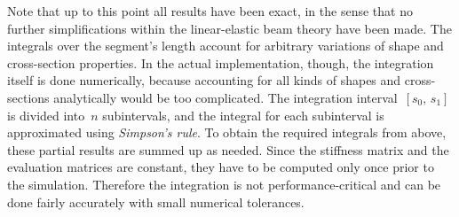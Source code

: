 Note that up to this point all results have been exact, in the sense that no further simplifications within the linear-elastic beam theory have been made.
The integrals over the segment's length account for arbitrary variations of shape and cross-section properties.
In the actual implementation, though, the integration itself is done numerically, because accounting for all kinds of shapes and cross-sections analytically would be too complicated.
The integration interval~$[s_0,\,s_1]$ is divided into~$n$ subintervals, and the integral for each subinterval is approximated using \textit{Simpson's rule}.
To obtain the required integrals from above, these partial results are summed up as needed.
Since the stiffness matrix and the evaluation matrices are constant, they have to be computed only once prior to the simulation.
Therefore the integration is not performance-critical and can be done fairly accurately with small numerical tolerances.






